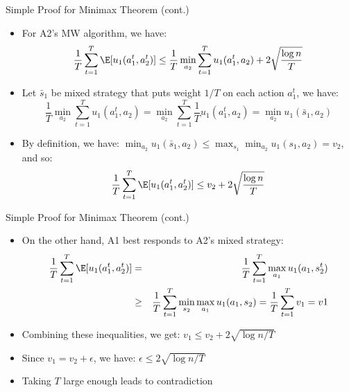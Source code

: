 \documentclass[11pt,aspectratio=169,handout]{beamer}
\begin{document}
  
  \begin{frame}{Simple Proof for Minimax Theorem (cont.)}
   \begin{itemize}[<+->]\small
    \item For A2's MW algorithm, we have:
    $$\frac{1}{T} \sum_{t=1}^T \E[u_1(a_1^t,a_2^t)] \le \frac{1}{T} \min_{a_2} \sum_{t=1}^T u_1(a_1^t,a_2) + 2\sqrt{\frac{\log n}{T}}$$
    \item Let $\bar{s}_1$ be mixed strategy that puts weight $1/T$ on each action $a_1^t$, we have:
    $$\frac{1}{T} \min_{a_2} \sum_{t=1}^T u_1(a_1^t,a_2) = \min_{a_2} \sum_{t=1}^T \frac{1}{T} u_1(a_1^t,a_2) = \min_{a_2} u_1(\bar{s}_1, a_2)$$
    \item By definition, we have: $\min_{a_2} u_1(\bar{s}_1, a_2) \le \max_{s_1} \min_{a_2} u_1(s_1, a_2) = v_2$, and so:
    $$\frac{1}{T} \sum_{t=1}^T \E[u_1(a_1^t,a_2^t)] \le v_2 + 2\sqrt{\frac{\log n}{T}}$$
   \end{itemize}
  \end{frame}
  
  
  \begin{frame}{Simple Proof for Minimax Theorem (cont.)}
   \begin{itemize}[<+->]
    \item On the other hand, A1 best responds to A2's mixed strategy:
    \begin{eqnarray*}
     \frac{1}{T}\sum_{t=1}^T\E[u_1(a_1^t,a_2^t)] & = & \frac{1}{T}\sum_{t=1}^T \max_{a_1}u_1(a_1,s_2^t) \\
     & \geq & \frac{1}{T}\sum_{t=1}^T \min_{s_2} \max_{a_1} u_1(a_1,s_2) = \frac{1}{T}\sum_{t=1}^T v_1 = v1\\
    \end{eqnarray*}
    \item Combining these inequalities, we get: $v_1 \leq v_2 + 2\sqrt{\log n/T}$
    \item Since $v_1 = v_2 + \epsilon$, we have: $\epsilon \leq 2\sqrt{\log n/T}$
    \item Taking $T$ large enough leads to contradiction
   \end{itemize}
  \end{frame}
  
\end{document}
